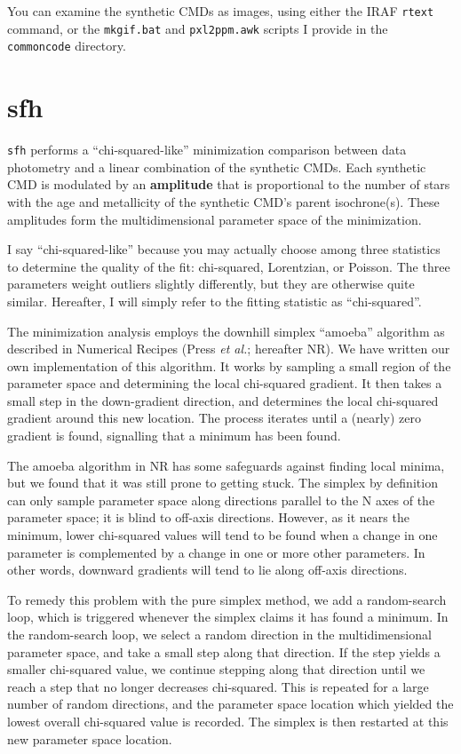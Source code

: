 \documentclass[12pt]{book}
\def\ttg{\tt\color{DarkGreen}}
\begin{document}
You can examine the synthetic CMDs as images, using either the IRAF 
{\tt rtext} command, or the {\ttg mkgif.bat} and {\ttg pxl2ppm.awk} 
scripts I provide in the {\ttg commoncode} directory.


\chapter{sfh}\label{ch:sfh}

{\ttg sfh} performs a ``chi-squared-like'' minimization comparison 
between data photometry and a linear combination of the synthetic 
CMDs.  Each synthetic CMD is modulated by an {\bf amplitude} that is 
proportional to the number of stars with the age and metallicity of 
the synthetic CMD's parent isochrone(s).  These amplitudes form the 
multidimensional parameter space of the minimization.

I say ``chi-squared-like'' because you may actually choose among three 
statistics to determine the quality of the fit: chi-squared, 
Lorentzian, or Poisson.  The three parameters weight outliers slightly 
differently, but they are otherwise quite similar.  Hereafter, I will 
simply refer to the fitting statistic as ``chi-squared''.

The minimization analysis employs the downhill simplex ``amoeba'' 
algorithm as described in Numerical Recipes (Press {\it et al.}; 
hereafter NR).  We have written our own implementation of this 
algorithm.  It works by sampling a small region of the parameter  
space and determining the local chi-squared gradient.  It then takes a 
small step in the down-gradient direction, and determines the local 
chi-squared gradient around this new location.  The process iterates 
until a (nearly) zero gradient is found, signalling that a minimum
has been found.  

The amoeba algorithm in NR has some safeguards against finding local 
minima, but we found that it was still prone to getting stuck.  The 
simplex by definition can only sample parameter space along directions 
parallel to the N axes of the parameter space; it is blind to off-axis 
directions.  However, as it nears the minimum, lower chi-squared 
values will tend to be found when a change in one parameter is 
complemented by a change in one or more other parameters.  In other 
words, downward gradients will tend to lie along off-axis directions.

To remedy this problem with the pure simplex method, we add a 
random-search loop, which is triggered whenever the simplex claims it 
has found a minimum.  In the random-search loop, we select a random 
direction in the multidimensional parameter space, and take a small 
step along that direction.  If the step yields a smaller chi-squared
value, we continue stepping along that direction until we reach a step 
that no longer decreases chi-squared.  This is repeated for a large 
number of random directions, and the parameter space location which 
yielded the lowest overall chi-squared value is recorded.  The simplex 
is then restarted at this new parameter space location.
\end{document}
